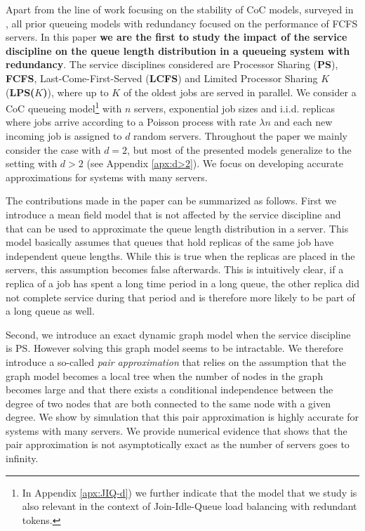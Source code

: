 \documentclass[acmsmall,nonacm]{acmart}
\begin{document}
Apart from the line of work focusing on the stability of CoC models, surveyed in \cite{anton_survey}, all prior queueing models with redundancy focused on the performance of FCFS servers. In this paper {\bf we are the first to study the impact of the service discipline on 
the queue length distribution in a 
queueing system with redundancy}. The service disciplines considered are Processor Sharing (\textbf{PS}),
\textbf{FCFS}, Last-Come-First-Served (\textbf{LCFS}) and Limited Processor Sharing $K$ (\textbf{LPS($K$)}), where up to $K$ of the oldest jobs are served in parallel. We consider a CoC queueing model\footnote{In Appendix \ref{apx:JIQ-d}) we further indicate that the model that we study is also relevant
in the context of Join-Idle-Queue load balancing \cite{lu1} with redundant tokens. } with $n$ servers, exponential job sizes and i.i.d. replicas where jobs arrive according to a Poisson process with rate $\lambda n$ and each new incoming job is assigned to $d$ random servers. Throughout the paper we mainly
consider  the case with $d=2$, but most of the presented models 
generalize to the setting with $d > 2$ (see Appendix \ref{apx:d>2}). 
We focus on developing accurate approximations for systems with many servers. 


The contributions made in the paper can be summarized as follows. First we introduce a mean field
model  that is not affected by the service discipline and that can be used to approximate the queue length distribution in a server. This model basically assumes that queues that hold replicas of the same
job have independent queue lengths. While this is true when the replicas are placed in the servers,
this assumption becomes false afterwards. This is intuitively clear, if a replica of a job has spent a long time period in a long queue, the other replica did not complete service during that period and
is therefore more likely to be part of a long queue as well.

Second, we introduce an exact dynamic graph model when the service discipline is PS. However solving
this graph model seems to be intractable. We therefore introduce a so-called {\it pair approximation}
that relies on the assumption that the graph model becomes a local tree when the number of
nodes in the graph becomes large and that there exists a conditional independence between the degree
of two nodes that are both connected to the same node with a given degree.
We show  by simulation that this pair approximation is highly accurate for systems with many servers. 
We provide numerical evidence that shows that the pair approximation is not asymptotically exact as the number of servers goes to infinity. 
\end{document}
